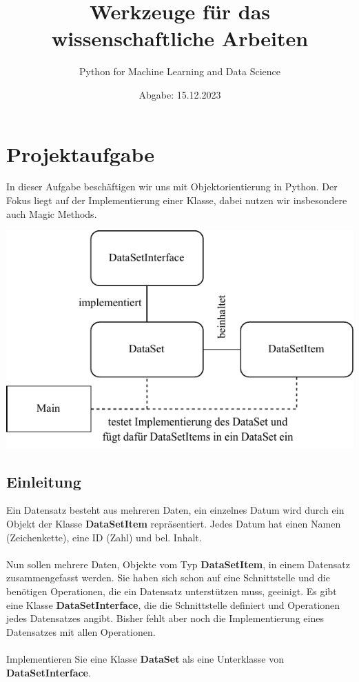 \documentclass{scrartcl}
\title{\textbf{\LARGE Werkzeuge für das wissenschaftliche Arbeiten}}
\subtitle{\small Python for Machine Learning and Data Science}
\author{Abgabe: 15.12.2023}
\date{}
\begin{document}
    \maketitle
    \tableofcontents

    \section[Projektaufgabe]{Projektaufgabe}

        In dieser Aufgabe beschäftigen wir uns mit Objektorientierung in Python.
        Der Fokus liegt auf der Implementierung einer Klasse, dabei nutzen wir insbesondere auch Magic Methods.\\
        
        \begin{center}
        \includegraphics{../diagram/classes_files.pdf}
        \end{center}

        \subsection{Einleitung}

            Ein Datensatz besteht aus mehreren Daten, ein einzelnes Datum wird durch ein Objekt der Klasse \textbf{DataSetItem} repräsentiert.
            Jedes Datum hat einen Namen (Zeichenkette), eine ID (Zahl) und bel. Inhalt.\\
            \\
            Nun sollen mehrere Daten, Objekte vom Typ \textbf{DataSetItem}, in einem Datensatz zusammengefasst werden.
            Sie haben sich schon auf eine Schnittstelle und die benötigen Operationen, die ein Datensatz unterstützen muss, geeinigt.
            Es gibt eine Klasse \textbf{DataSetInterface}, die die Schnittstelle definiert und Operationen jedes Datensatzes angibt.
            Bisher fehlt aber noch die Implementierung eines Datensatzes mit allen Operationen.\\
            \\
            Implementieren Sie eine Klasse \textbf{DataSet} als eine Unterklasse von \textbf{DataSetInterface}.
        
\end{document}
